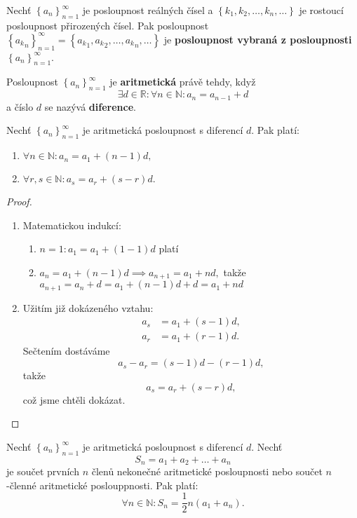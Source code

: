 \begin{definition}
Nechť $\left \{ a_n \right \}_{n=1}^\infty $ je posloupnost reálných čísel a
$\left \{ k_1,k_2,\dots,k_n,\dots \right \} $ je rostoucí posloupnost přirozených čísel.
Pak posloupnost $\left \{{a_k}_n \right \}_{n=1}^\infty = \left \{ {a_k}_1, {a_k}_2, \dots, {a_k}_n,\dots \right \}  $
je \textbf{posloupnost vybraná z posloupnosti} $\left \{ a_n \right \}_{n=1}^\infty $.
\end{definition}

\begin{definition}
Posloupnost $\left \{ a_n \right \}_{n=1}^\infty $ je \textbf{aritmetická} právě
tehdy, když
$$\exists d \in \mathbb R: \forall n \in \mathbb N: a_n=a_{n-1}+d$$
a číslo $d$ se nazývá \textbf{diference}.
\end{definition}

\begin{veta}
    Nechť $\left \{ a_n \right \}_{n=1}^\infty $ je aritmetická posloupnost s diferencí
    $d$. Pak platí:
    \begin{enumerate}[$i.$]
    \item $\forall n\in \mathbb N: a_n = a_1 + (n-1)d,$
   	\item $\forall r,s \in \mathbb N: a_s = a_r + (s-r)d.$
    \end{enumerate}
\end{veta}

\begin{proof}
\begin{enumerate}[$i.$]
\item Matematickou indukcí:
\begin{enumerate}[1.]
\item $n=1: a_1 = a_1+(1-1)d$ platí
\item $a_n = a_1+(n-1)d \implies a_{n+1}=a_1+nd,$ takže $a_{n+1}=a_n+d=a_1+(n-1)d+d=a_1+nd$
\end{enumerate}
\item Užitím již dokázeného vztahu:
\begin{align*}
    a_s &= a_1 + (s-1)d,\\
    a_r &= a_1 + (r-1)d.
\end{align*}
Sečtením dostáváme
$$a_s-a_r = (s-1)d-(r-1)d,$$
takže
$$a_s=a_r+(s-r)d,$$
což jsme chtěli dokázat.\qedhere
\end{enumerate}
\end{proof}

\begin{veta}
Nechť $\left \{ a_n \right \}_{n=1}^\infty $ je aritmetická posloupnost s diferencí
$d$. Nechť
$$S_n=a_1+a_2+\dots+a_n$$
je součet prvních $n$ členů nekonečné aritmetické posloupnosti nebo součet
$n$-členné aritmetické poslouppnosti. Pak platí:
$$\forall n \in \mathbb N:S_n = \frac{1}{2}n(a_1+a_n).$$
\end{veta}

